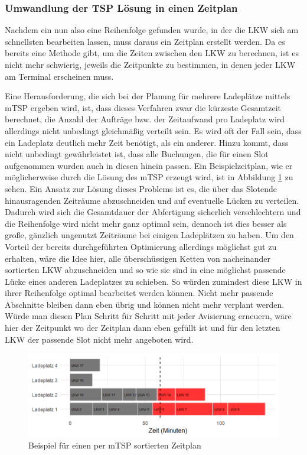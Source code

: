 \subsubsection{Umwandlung der TSP Lösung in einen Zeitplan}
\label{sec:tspToSchedule}

Nachdem ein nun also eine Reihenfolge gefunden wurde, in der die LKW sich am schnellsten bearbeiten lassen, muss daraus ein Zeitplan erstellt werden. Da es bereits eine Methode gibt, um die Zeiten zwischen den LKW zu berechnen, ist es nicht mehr schwierig, jeweils die Zeitpunkte zu bestimmen, in denen jeder LKW am Terminal erscheinen muss.

Eine Herausforderung, die sich bei der Planung für mehrere Ladeplätze mittels mTSP ergeben wird, ist, dass dieses Verfahren zwar die kürzeste Gesamtzeit berechnet, die Anzahl der Aufträge bzw. der Zeitaufwand pro Ladeplatz wird allerdings nicht unbedingt gleichmäßig verteilt sein. Es wird oft der Fall sein, dass ein Ladeplatz deutlich mehr Zeit benötigt, als ein anderer. Hinzu kommt, dass nicht unbedingt gewährleistet ist, dass alle Buchungen, die für einen Slot aufgenommen wurden auch in diesen hinein passen. Ein Beispielzeitplan, wie er möglicherweise durch die Lösung des mTSP erzeugt wird, ist in Abbildung \ref{fig:tspCutExample1} zu sehen. Ein Ansatz zur Lösung dieses Problems ist es, die über das Slotende hinausragenden Zeiträume abzuschneiden und auf eventuelle Lücken zu verteilen. Dadurch wird sich die Gesamtdauer der Abfertigung sicherlich verschlechtern und die Reihenfolge wird nicht mehr ganz optimal sein, dennoch ist dies besser als große, gänzlich ungenutzt Zeiträume bei einigen Ladeplätzen zu haben. Um den Vorteil der bereits durchgeführten Optimierung allerdings möglichst gut zu erhalten, wäre die Idee hier, alle überschüssigen Ketten von nacheinander sortierten LKW abzuschneiden und so wie sie sind in eine möglichst passende Lücke eines anderen Ladeplatzes zu schieben. So würden zumindest diese LKW in ihrer Reihenfolge optimal bearbeitet werden können. Nicht mehr passende Abschnitte bleiben dann eben übrig und können nicht mehr verplant werden. Würde man diesen Plan Schritt für Schritt mit jeder Avisierung erneuern, wäre hier der Zeitpunkt wo der Zeitplan dann eben gefüllt ist und für den letzten LKW der passende Slot nicht mehr angeboten wird. 


\begin{figure}[H]
    \centering
    \includegraphics[width=\textwidth]{images/timelines/timelineTspCutExample1.png}
    \caption{Beispiel für einen per mTSP sortierten Zeitplan}
    \label{fig:tspCutExample1}
\end{figure}

